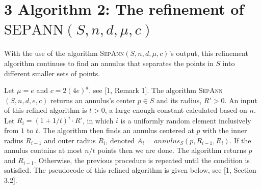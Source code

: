 \documentclass[12pt,english,]{article}
\newcommand{\pnt}[1]{{\scriptstyle#1}}
\begin{document}
\hypertarget{algorithm-2-the-refinement-of-mathrmspntepapntnnsndmuc}{%
\section{\texorpdfstring{3 \enspace Algorithm 2: The refinement of
\(\mathrm{S\pnt{EP}A\pnt{NN}}(S,n,d,\mu,c)\)}{3 Algorithm 2: The refinement of \textbackslash{}mathrm\{S\textbackslash{}pnt\{EP\}A\textbackslash{}pnt\{NN\}\}(S,n,d,\textbackslash{}mu,c)}}\label{algorithm-2-the-refinement-of-mathrmspntepapntnnsndmuc}}

With the use of the algorithm \textsc{SepAnn$(S,n,d,\mu,c)$}'s output,
this refinement algorithm continues to find an annulus that separates
the points in \(S\) into different smaller sets of points.

Let \(\mu = e\) and \(c = 2(4e)^d\), see {[}1, Remark 1{]}. The
algorithm \textsc{SepAnn$(S,n,d,e,c)$} returns an annulus's center
\(p \in S\) and its radius, \(R'>0\). An input of this refined algorithm
is \(t > 0\), a large enough constant calculated based on \(n\). Let
\(R_i = (1+1/t)^i\cdot R'\), in which \(i\) is a uniformly random
element inclusively from \(1\) to \(t\). The algorithm then finds an
annulus centered at \(p\) with the inner radius \(R_{i-1}\) and outer
radius \(R_{i}\), denoted \(A_i = annulus_S(p, R_{i-1}, R_i)\). If the
annulus contains at most \(n/t\) points then we are done. The algorithm
returns \(p\) and \(R_{i-1}\). Otherwise, the previous procedure is
repeated until the condition is satisfied. The pseudocode of this
refined algorithm is given below, see {[}1, Section 3.2{]}.
\end{document}
